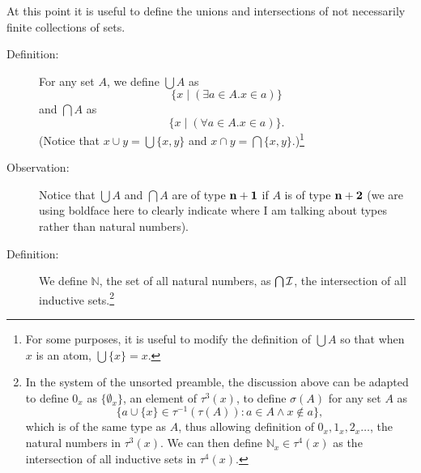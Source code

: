 \documentclass[12pt]{book}
\begin{document}
At this point it is useful to define the unions and intersections of
not necessarily finite collections of sets.  

\begin{description}

\item[Definition:]  For any set $A$, we
define $\bigcup A$ as $$\{x \mid (\exists a \in A.x \in a)\}$$ and
$\bigcap A$ as $$\{x \mid (\forall a \in A.x \in a)\}.$$  (Notice that $x
\cup y = \bigcup \{x,y\}$ and $x \cap y = \bigcap\{x,y\}$.)\footnote{For some purposes, it is useful to modify the definition of $\bigcup A$ so that
when $x$ is an atom, $\bigcup \{x\} = x$.}

\item[Observation:] Notice that $\bigcup A$ and $\bigcap A$ are of
type ${\bf n+1}$ if $A$ is of type ${\bf n+2}$ (we are using boldface here to clearly indicate where I am talking about types rather than natural numbers).

\item[Definition:]  We define ${\mathbb N}$, the set of all natural numbers, as $\bigcap
{\cal I}$, the intersection of all inductive sets.\footnote{In the system of the unsorted preamble, the discussion above can be adapted to
define $0_x$ as $\{\emptyset_x\}$, an element of $\tau^3(x)$, to define $\sigma(A)$ for any set $A$ as $$\{a \cup \{x\} \in \tau^{-1}(\tau(A)):a \in A \wedge x \not\in a\},$$ which is of the same type as $A$, thus allowing definition of $0_x,1_x,2_x\ldots$, the natural numbers in $\tau^3(x)$.  We can then define ${\mathbb N}_x  \in \tau^4(x)$ as the intersection of all inductive sets in $\tau^4(x)$.}

\end{description}
\end{document}
